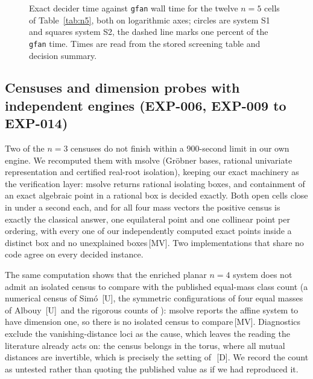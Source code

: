 \documentclass[11pt]{article}
\theoremstyle{definition}
\theoremstyle{remark}
\newcommand{\mk}[1]{\,{\scriptsize[#1]}}
\newcommand{\MV}{\mk{MV}}
\newcommand{\Dm}{\mk{D}}
\newcommand{\Um}{\mk{U}}
\begin{document}
\begin{figure}[t]\centering
{}
\caption{Exact decider time against \texttt{gfan} wall time for the twelve $n=5$ cells of Table~\ref{tab:n5}, both
on logarithmic axes; circles are system S1 and squares system S2, the dashed line marks one percent of the
\texttt{gfan} time. Times are read from the stored screening table and decision summary.}\label{fig:times}
\end{figure}

\subsection{Censuses and dimension probes with independent engines (EXP-006, EXP-009 to EXP-014)}\label{sec:census}

Two of the $n=3$ censuses do not finish within a 900-second limit in our own engine. %
We recomputed them with msolve (Gr\"obner bases, rational univariate representation and
certified real-root isolation), keeping our exact machinery as the verification
layer: msolve returns rational isolating boxes, and containment of an exact
algebraic point in a rational box is decided exactly. Both open cells close in under
a second each, and for all four mass vectors the positive census is exactly the
classical answer, one equilateral point and one collinear point per ordering, with
every one of our independently computed exact points inside a distinct box and no
unexplained boxes\MV. Two implementations that share no code agree on every decided
instance.

The same computation shows that the enriched planar $n=4$ system does not admit an
isolated census to compare with the published equal-mass class count (a numerical census of Sim\'o \cite{Simo78}\Um,
the symmetric configurations of four equal masses of Albouy \cite{Albouy96}\Um\ and the rigorous counts of
\cite{MZ19}): msolve reports
the affine system to have dimension one, so there is no
isolated census to compare\MV. Diagnostics exclude the vanishing-distance loci as the
cause, which leaves the reading the literature already acts on: the census belongs in
the torus, where all mutual distances are invertible, which is precisely the setting
of~\cite{HM06}\Dm. We record the count as untested rather than quoting the published
value as if we had reproduced it.
\end{document}
